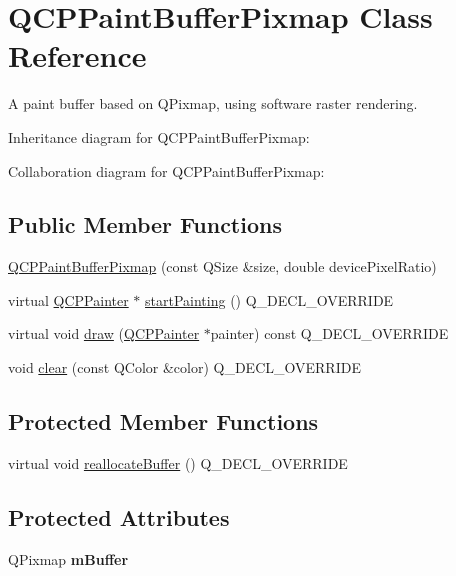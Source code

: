 \hypertarget{classQCPPaintBufferPixmap}{}\section{Q\+C\+P\+Paint\+Buffer\+Pixmap Class Reference}
\label{classQCPPaintBufferPixmap}


A paint buffer based on Q\+Pixmap, using software raster rendering.  




Inheritance diagram for Q\+C\+P\+Paint\+Buffer\+Pixmap\+:


Collaboration diagram for Q\+C\+P\+Paint\+Buffer\+Pixmap\+:
\subsection*{Public Member Functions}
\begin{DoxyCompactItemize}
\item 
\hyperlink{classQCPPaintBufferPixmap_aef0224e03b9285509391fcd61a8e6844}{Q\+C\+P\+Paint\+Buffer\+Pixmap} (const Q\+Size \&size, double device\+Pixel\+Ratio)
\item 
virtual \hyperlink{classQCPPainter}{Q\+C\+P\+Painter} $\ast$ \hyperlink{classQCPPaintBufferPixmap_a357964ef7d28cfa530338be4e5c93234}{start\+Painting} () Q\+\_\+\+D\+E\+C\+L\+\_\+\+O\+V\+E\+R\+R\+I\+DE
\item 
virtual void \hyperlink{classQCPPaintBufferPixmap_af7bfc685e56a0a9329e57cd9a265eb74}{draw} (\hyperlink{classQCPPainter}{Q\+C\+P\+Painter} $\ast$painter) const Q\+\_\+\+D\+E\+C\+L\+\_\+\+O\+V\+E\+R\+R\+I\+DE
\item 
void \hyperlink{classQCPPaintBufferPixmap_a14badbd010a3cde6b55817ccb7b65217}{clear} (const Q\+Color \&color) Q\+\_\+\+D\+E\+C\+L\+\_\+\+O\+V\+E\+R\+R\+I\+DE
\end{DoxyCompactItemize}
\subsection*{Protected Member Functions}
\begin{DoxyCompactItemize}
\item 
virtual void \hyperlink{classQCPPaintBufferPixmap_ad49f3205ba3463b1c44f8db3cfcc90f0}{reallocate\+Buffer} () Q\+\_\+\+D\+E\+C\+L\+\_\+\+O\+V\+E\+R\+R\+I\+DE
\end{DoxyCompactItemize}
\subsection*{Protected Attributes}
\begin{DoxyCompactItemize}
\item 
\mbox{\label{classQCPPaintBufferPixmap_a6d7009f45f03e305f2dc00e52a9225f8}} 
Q\+Pixmap {\bfseries m\+Buffer}
\end{DoxyCompactItemize}



